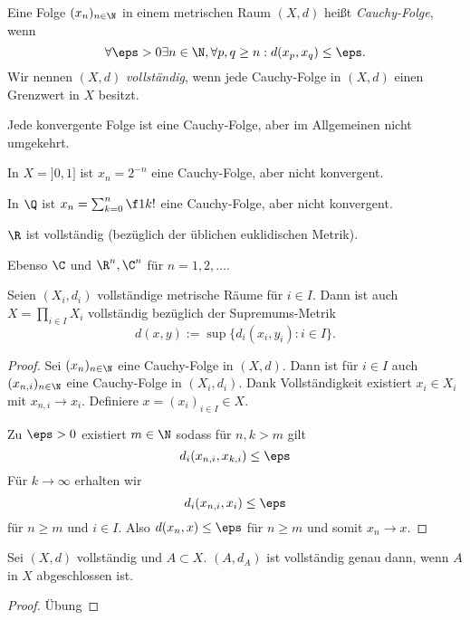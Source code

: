 \begin{df}
	Eine Folge $(x_n)_{n\in \N}$ in einem metrischen Raum $(X,d)$ heißt \emph{Cauchy-Folge}, wenn
	\[
		\forall \eps > 0 \exists n \in \N, \forall p,q \ge n : d(x_p,x_q) \le \eps.
	\]
	Wir nennen $(X,d)$ \emph{vollständig}, wenn jede Cauchy-Folge in $(X,d)$ einen Grenzwert in $X$ besitzt.
\end{df}

\begin{nt}
	Jede konvergente Folge ist eine Cauchy-Folge, aber im Allgemeinen nicht umgekehrt.
\end{nt}

\begin{ex}
	In $X = ]0,1]$ ist $x_n = 2^{-n}$ eine Cauchy-Folge, aber nicht konvergent.

	In $\Q$ ist $x_n = \sum_{k=0}^n \f 1{k!}$ eine Cauchy-Folge, aber nicht konvergent.
\end{ex}

\begin{st}
	$\R$ ist vollständig (bezüglich der üblichen euklidischen Metrik).

	Ebenso $\C$ und $\R^n, \C^n$ für $n = 1, 2, \dotsc$.
\end{st}

\begin{st}
	Seien $(X_i,d_i)$ vollständige metrische Räume für $i \in I$.
	Dann ist auch $X = \prod_{i\in I} X_i$ vollständig bezüglich der Supremums-Metrik
	\[
		d(x,y) := \sup \{ d_i(x_i, y_i) : i \in I \}.
	\]
	\begin{proof}
		Sei $(x_n)_{n\in \N}$ eine Cauchy-Folge in $(X,d)$.
		Dann ist für $i \in I$ auch $(x_{n,i})_{n\in \N}$ eine Cauchy-Folge in $(X_i,d_i)$.
		Dank Vollständigkeit existiert $x_i \in X_i$ mit $x_{n,i} \to x_i$.
		Definiere $ x= (x_i)_{i\in I} \in X$.

		Zu  $\eps > 0$ existiert $m \in \N$ sodass für $n,k > m$ gilt
		\[
			d_i(x_{n,i}, x_{k,i}) \le \eps
		\]
		Für $k \to \infty$ erhalten wir
		\[
			d_i(x_{n,i},x_i) \le \eps
		\]
		für $n \ge m$ und $i \in I$.
		Also $d(x_n, x) \le \eps$ für $n \ge m$ und somit $x_n \to x$.
	\end{proof}
\end{st}

\begin{lem}
	Sei $(X,d)$ vollständig und $A \subset X$.
	$(A,d_A)$ ist vollständig genau dann, wenn $A$ in $X$ abgeschlossen ist.
	\begin{proof}
		Übung
	\end{proof}
\end{lem}

